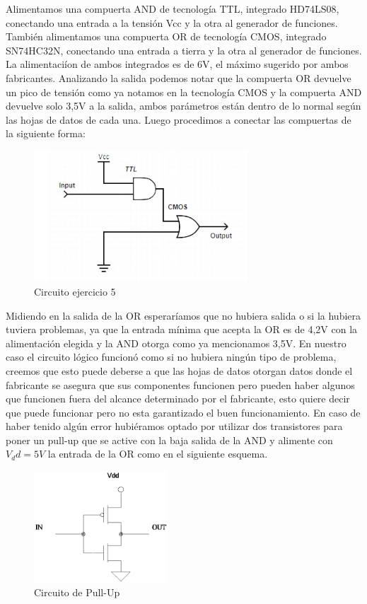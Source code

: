 
Alimentamos una compuerta AND de tecnolog\'ia TTL, integrado HD74LS08, conectando una entrada a la tensi\'on Vcc y la otra al generador de funciones. Tambi\'en alimentamos una compuerta OR de tecnolog\'ia CMOS, integrado SN74HC32N, conectando una entrada a tierra y la otra al generador de funciones. La alimentaci\'ion de ambos integrados es de 6V, el m\'aximo sugerido por ambos fabricantes. Analizando la salida podemos notar que la compuerta OR devuelve un pico de tensi\'on como ya notamos en la tecnolog\'ia CMOS y la compuerta AND devuelve solo 3,5V a la salida, ambos par\'ametros est\'an dentro de lo normal seg\'un las hojas de datos de cada una. Luego procedimos a conectar las compuertas de la siguiente forma:

\begin{figure}[hbtp]
\centering
\includegraphics[width=8cm]{ejercicio5/E3_CirEj5.jpg}  
\caption{Circuito ejercicio 5}
\end{figure}


Midiendo en la salida de la OR esperar\'iamos que no hubiera salida o si la hubiera tuviera problemas, ya que la entrada m\'inima que acepta la OR es de 4,2V con la alimentaci\'on elegida y la AND otorga como ya mencionamos 3,5V. En nuestro caso el circuito l\'ogico funcion\'o como si no hubiera ning\'un tipo de problema, creemos que esto puede deberse a que las hojas de datos otorgan datos donde el fabricante se asegura que sus componentes funcionen pero pueden haber algunos que funcionen fuera del alcance determinado por el fabricante, esto quiere decir que puede funcionar pero no esta garantizado el buen funcionamiento. En caso de haber tenido alg\'un error hubi\'eramos optado por utilizar dos transistores para poner un pull-up que se active con la baja salida de la AND y alimente con $V_dd=5V$ la entrada de la OR como en el siguiente esquema.

\begin{figure}[hbtp]
\centering
\includegraphics[width=5cm]{ejercicio5/PullUp.jpg} 
\caption{Circuito de Pull-Up}
\end{figure}

